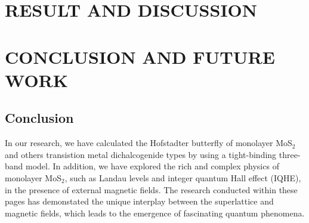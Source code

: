 \documentclass{report}
\newcommand{\f}[2]{\dfrac{#1}{#2}}
\begin{document}
%
%
%
%

\chapter{RESULT AND DISCUSSION}
\chapter{CONCLUSION AND FUTURE WORK}
\section{Conclusion}
In our research, we have calculated the Hofstadter butterfly of monolayer MoS$_{2}$ and others transistion metal dichalcogenide types by using a tight-binding three-band model. In addition, we have explored the rich and complex physics of monolayer MoS$_2$, such as Landau levels and integer quantum Hall effect (IQHE), in the presence of external magnetic fields. The research conducted within these pages has demonstated the unique interplay between the superlattice and magnetic fields, which leads to the emergence of fascinating quantum phenomena. 
\end{document}
